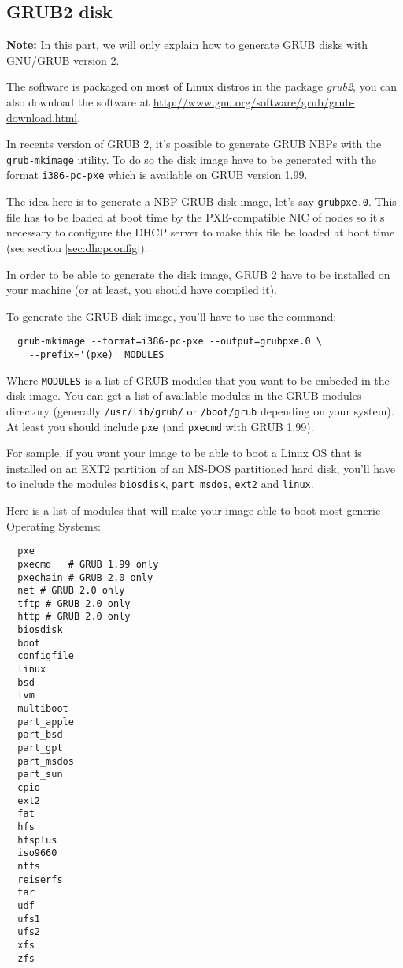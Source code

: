 \documentclass[a4paper,11pt]{article}
\begin{document}
\subsection{GRUB2 disk\label{sec:config:grub}}
\textbf{Note:} In this part, we will only explain how to generate GRUB disks with GNU/GRUB version 2.

The software is packaged on most of Linux distros in the package \emph{grub2}, you can also download the software at \url{http://www.gnu.org/software/grub/grub-download.html}.

In recents version of GRUB 2, it's possible to generate GRUB NBPs with the \texttt{grub-mkimage} utility. To do so the disk image have to be generated with the format \texttt{i386-pc-pxe} which is available on GRUB version 1.99.

The idea here is to generate a NBP GRUB disk image, let's say \texttt{grubpxe.0}. This file has to be loaded at boot time by the PXE-compatible NIC of nodes so it's necessary to configure the DHCP server to make this file be loaded at boot time (see section \ref{sec:dhcpconfig}).

In order to be able to generate the disk image, GRUB 2 have to be installed on your machine (or at least, you should have compiled it).

To generate the GRUB disk image, you'll have to use the command:
\begin{verbatim}
  grub-mkimage --format=i386-pc-pxe --output=grubpxe.0 \
    --prefix='(pxe)' MODULES
\end{verbatim}
Where \texttt{MODULES} is a list of GRUB modules that you want to be embeded in the disk image. You can get a list of available modules in the GRUB modules directory (generally \texttt{/usr/lib/grub/} or \texttt{/boot/grub} depending on your system). At least you should include \texttt{pxe} (and \texttt{pxecmd} with GRUB 1.99).

For sample, if you want your image to be able to boot a Linux OS that is installed on an EXT2 partition of an MS-DOS partitioned hard disk, you'll have to include the modules \texttt{biosdisk}, \texttt{part\_msdos}, \texttt{ext2} and \texttt{linux}.

Here is a list of modules that will make your image able to boot most generic Operating Systems:
\begin{multicols}{2}
\begin{verbatim}
  pxe
  pxecmd   # GRUB 1.99 only
  pxechain # GRUB 2.0 only
  net # GRUB 2.0 only
  tftp # GRUB 2.0 only
  http # GRUB 2.0 only
  biosdisk
  boot
  configfile
  linux
  bsd
  lvm
  multiboot
  part_apple
  part_bsd
  part_gpt
  part_msdos
  part_sun
  cpio
  ext2
  fat
  hfs
  hfsplus
  iso9660
  ntfs
  reiserfs
  tar
  udf
  ufs1
  ufs2
  xfs
  zfs
\end{verbatim}
\end{multicols}
\end{document}
